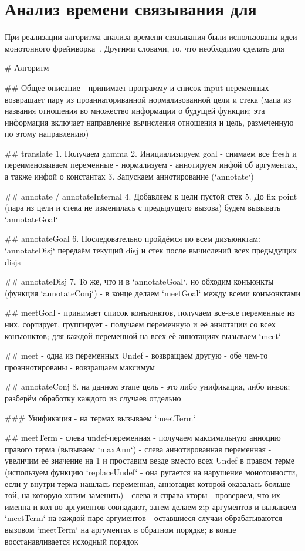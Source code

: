 \documentclass[conference]{IEEEtran}
\begin{document}
\section{Анализ времени связывания для \miniKanren}\label{bta}

При реализации алгоритма анализа времени связывания были использованы идеи монотонного фреймворка~\cite{kam1977monotone}. Другими словами, то, что необходимо сделать для 

\# Алгоритм

\#\# Общее описание
- принимает программу и список input-переменных
- возвращает пару из проаннаториванной нормализованной цели и стека (мапа из названия отношения во множество информации о будущей функции; эта информация включает направление вычисления отношения и цель, размеченную по этому направлению)


\#\# translate
1. Получаем gamma
2. Инициализируем goal
  - снимаем все fresh и переименовываем переменные
  - нормализуем
  - аннотируем инфой об аргументах, а также инфой о константах
3. Запускаем аннотирование (`annotate`)

\#\# annotate / annotateInternal
4. Добавляем к цели пустой стек 
5. До fix point (пара из цели и стека не изменилась с предыдущего вызова) будем вызывать `annotateGoal`

\#\# annotateGoal
6. Последовательно пройдёмся по всем дизъюнктам: `annotateDisj` передаём текущий disj и стек после вычислений всех предыдущих disjs

\#\# annotateDisj
7. То же, что и в `annotateGoal`, но обходим конъюнкты (функция `annotateConj`) - в конце делаем `meetGoal` между всеми конъюнктами

\#\# meetGoal
- принимает список конъюнктов, получаем все-все переменные из них, сортирует, группирует - получаем переменную и её аннотации со всех конъюнктов; для каждой переменной на всех её аннотациях вызываем `meet`

\#\# meet
- одна из переменных Undef - возвращаем другую
- обе чем-то проаннотированы - вовзращаем максимум

\#\# annotateConj
8. на данном этапе цель - это либо унификация, либо инвок; разберём обработку каждого из случаев отдельно

\#\#\# Унификация
- на термах вызываем `meetTerm`

\#\# meetTerm
- слева undef-переменная - получаем максимальную анноцию правого терма (вызываем `maxAnn`)
- слева аннотированная переменная - увеличим её значение на 1 и проставим везде вместо всех Undef в правом терме (используем функцию `replaceUndef` - она ругается на нарушение монотонности, если у внутри терма нашлась переменная, аннотация которой оказалась больше той, на которую хотим заменить)
- слева и справа кторы - проверяем, что их именна и кол-во аргументов совпадают, затем делаем zip аргументов и вызываем `meetTerm` на каждой паре аргументов
- оставшиеся случаи обрабатываются вызовом `meetTerm` на аргументах в обратном порядке; в конце восстанавливается исходный порядок
\end{document}

